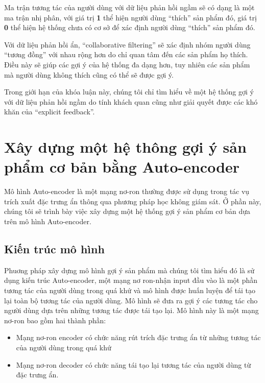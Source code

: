     Ma trận tương tác của người dùng với dữ liệu phản hồi ngầm sẽ có dạng là một ma trận nhị phân, với giá trị \textbf{1} 
    thể hiện người dùng ``thích'' sản phẩm đó, giá trị \textbf{0} thể hiện hệ thống chưa có cơ sở để xác định người dùng ``thích'' sản phẩm đó.

    Với dữ liệu phản hồi ẩn, ``collaborative filtering'' sẽ xác định nhóm người dùng ``tương đồng'' với nhau rộng hơn
    do chỉ quan tâm đến các sản phẩm họ thích. Điều này sẽ giúp các gợi ý của hệ thống 
    đa dạng hơn, tuy nhiên các sản phẩm mà người dùng không thích cũng có thể sẽ được gợi ý.

    Trong giới hạn của khóa luận này, chúng tôi chỉ tìm hiểu về một hệ thống gợi ý với dữ liệu phản hồi ngầm do tính khách quan
    cũng như giải quyết được các khó khăn của ``explicit feedback''.

\section{Xây dựng một hệ thông gợi ý sản phẩm cơ bản bằng Auto-encoder}
    Mô hình Auto-encoder là một mạng nơ-ron thường được sử dụng trong tác vụ trích xuất đặc trưng ẩn thông qua phương pháp học không giám sát.
    Ở phần này, chúng tôi sẽ trình bày việc xây dựng một hệ thống gợi ý sản phẩm cơ bản dựa trên mô hình Auto-encoder.

    \subsection{Kiến trúc mô hình}
    \label{chap3/sec11}
    Phuơng pháp xây dựng mô hình gợi ý sản phẩm mà chúng tôi tìm hiểu đó là sử dụng kiến trúc Auto-encoder, một mạng nơ ron-nhận input đầu vào là một phần tương tác của người dùng trong quá khứ và mô hình được huấn luyện để tái tạo lại toàn bộ tương tác của người dùng. 
    Mô hình sẽ đưa ra gợi ý các tương tác cho người dùng dựa trên những tương tác được tái tạo lại.
    Mô hình này là một mạng nơ-ron bao gồm hai thành phần:
    \begin{itemize}
        \item Mạng nơ-ron encoder có chức năng rút trích đặc trưng ẩn từ những tương tác của người dùng trong quá khứ
        \item Mạng nơ-ron decoder có chức năng tái tạo lại tương tác của người dùng từ đặc trưng ẩn.
    \end{itemize}

